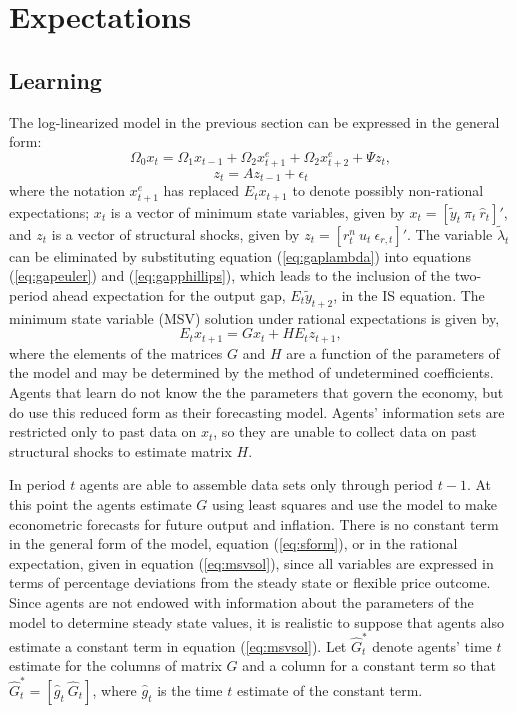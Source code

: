 \documentclass[12pt]{article}
\newcommand{\beq}{\begin{equation}}
\newcommand{\eeq}{\end{equation}}
\newcommand{\h}[1]{\hat{#1}}
\begin{document}
\section{Expectations} \label{s:exp}
\subsection{Learning}
The log-linearized model in the previous section can be expressed in the general form:
\beq \label{eq:sform} \Omega_{0} x_t = \Omega_{1} x_{t-1} + \Omega_{2} x_{t+1}^e + \Omega_{2} x_{t+2}^e + \Psi z_t, \eeq
\beq \label{eq:sformsh} z_t = A z_{t-1} + \epsilon_t \eeq
where the notation $x_{t+1}^e$ has replaced $E_t x_{t+1}$ to denote possibly non-rational expectations; $x_t$ is a vector of minimum state variables, given by  $x_t = [\tilde{y}_t~ \pi_t~ \h{r}_t]'$, and $z_t$ is a vector of structural shocks, given by $z_t = [r_t^n~ u_t~ \epsilon_{r,t}]'$.  The variable $\tilde{\lambda}_t$ can be eliminated by substituting equation (\ref{eq:gaplambda}) into equations (\ref{eq:gapeuler}) and (\ref{eq:gapphillips}), which leads to the inclusion of the two-period ahead expectation for the output gap, $E_t \tilde{y}_{t+2}$, in the IS equation.  The minimum state variable (MSV) solution under rational expectations is given by,
\beq \label{eq:msvsol} E_t x_{t+1} = G x_{t} + H E_t z_{t+1}, \eeq
where the elements of the matrices $G$ and $H$ are a function of the parameters of the model and may be determined by the method of undetermined coefficients.  Agents that learn do not know the the parameters that govern the economy, but do use this reduced form as their forecasting model.  Agents' information sets are restricted only to past data on $x_t$, so they are unable to collect data on past structural shocks to estimate matrix $H$.  

In period $t$ agents are able to assemble data sets only through period $t-1$.  At this point the agents estimate $G$ using least squares and use the model to make econometric forecasts for future output and inflation.  There is no constant term in the general form of the model, equation (\ref{eq:sform}), or in the rational expectation, given in equation (\ref{eq:msvsol}), since all variables are expressed in terms of percentage deviations from the steady state or flexible price outcome.  Since agents are not endowed with information about the parameters of the model to determine steady state values, it is realistic to suppose that agents also estimate a constant term in equation (\ref{eq:msvsol}).  Let $\h{G}_t^*$ denote agents' time $t$ estimate for the columns of matrix $G$ and a column for a constant term so that $\h{G}_t^* = [\h{g}_{t}~ \h{G}_t]$, where $\h{g}_{t}$ is the time $t$ estimate of the constant term. 
\end{document}

